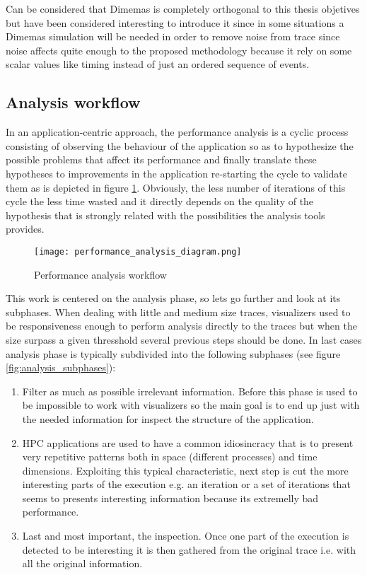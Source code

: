 Can be considered that Dimemas is completely orthogonal to this thesis objetives
but have been considered interesting to introduce it since in some situations a
Dimemas simulation will be needed in order to remove noise from trace since
noise affects quite enough to the proposed methodology because it rely on some
scalar values like timing instead of just an ordered sequence of events.

\subsection{Analysis workflow}\label{ss:analysis_workflow}

In an application-centric approach, the performance analysis is a cyclic process 
consisting of observing the behaviour of the application so as to hypothesize the 
possible problems that affect its performance and finally translate these 
hypotheses to improvements in the application re-starting the cycle to validate 
them as is depicted in figure \ref{fig:perf_analysis_workflow}. Obviously, the 
less number of iterations of this cycle the less time wasted and it directly 
depends on the quality of the hypothesis that is strongly related with the 
possibilities the analysis tools provides.

\begin{figure}[]
  \centering
  \texttt{[image: performance\_analysis\_diagram.png]}
  \caption{Performance analysis workflow}
  \label{fig:perf_analysis_workflow}
\end{figure}

This work is centered on the analysis phase, so lets go further and look at its
subphases. When dealing with little and medium size traces, visualizers used to
be responsiveness enough to perform analysis directly to the traces but when the 
size surpass a given thresshold several previous steps should be done. In last 
cases analysis phase is typically subdivided into the following 
subphases (see figure \ref{fig:analysis_subphases}):
\begin{enumerate}[label=\roman*)]
  \item Filter as much as possible irrelevant information. Before this phase is
    used to be impossible to work with visualizers so the main goal is to end up
    just with the needed information for inspect the structure of the
    application.
  \item HPC applications are used to have a common idiosincracy that is to
    present very repetitive patterns both in space (different processes) and 
    time dimensions. Exploiting this typical characteristic, next step is cut
    the more interesting parts of the execution e.g. an iteration or a set of
    iterations that seems to presents interesting information because its 
    extremelly bad performance.
  \item Last and most important, the inspection. Once one part of the execution is
    detected to be interesting it is then gathered from the original trace i.e.
    with all the original information.
\end{enumerate}

